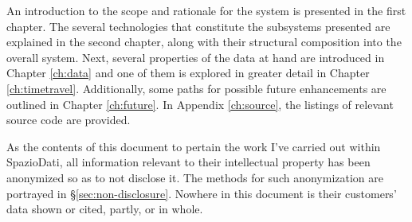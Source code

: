 An introduction to the scope and rationale for the system is presented in the first chapter.
The several technologies that constitute the subsystems presented are explained in the second chapter, along with their structural composition into the overall system.
Next, several properties of the data at hand are introduced in Chapter \ref{ch:data} and one of them is explored in greater detail in Chapter \ref{ch:timetravel}.
Additionally, some paths for possible future enhancements are outlined in Chapter \ref{ch:future}.
In Appendix \ref{ch:source}, the listings of relevant source code are provided.

As the contents of this document to pertain the work I've carried out within SpazioDati, all information relevant to their intellectual property has been anonymized so as to not disclose it.
The methods for such anonymization are portrayed in \S \ref{sec:non-disclosure}.
Nowhere in this document is their customers' data shown or cited, partly, or in whole.
